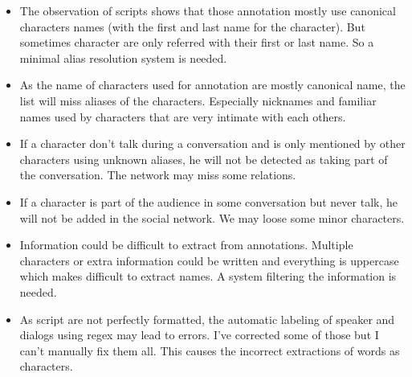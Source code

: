\documentclass[a4paper, 12pt]{report}
\begin{document}
\begin{itemize}
\item 
 The observation of scripts shows that those annotation mostly use canonical characters names (with the first and last name for the character). 
 But sometimes character are only referred with their first or last name. So a minimal alias resolution system is needed. 
\item
As the name of characters used for annotation are mostly canonical name, the list will miss aliases of the characters. 
Especially nicknames and familiar names used by characters that are very intimate with each others.
\item If a character don't talk during a conversation and is only mentioned by other characters using unknown aliases, 
he will not be detected as taking part of the conversation. The network may miss some relations.
\item 
If a character is part of the audience in some conversation but never talk, he will not be added in the social network. We may loose some minor characters.
\item Information could be difficult to extract from annotations. 
Multiple characters or extra information could be written and everything is uppercase which makes difficult to extract names. A system filtering the information is needed.
\item As script are not perfectly formatted, the automatic labeling of speaker and dialogs using regex may lead to errors. 
I've corrected some of those but I can't manually fix them all. This causes the incorrect extractions of words as characters. 
\end{itemize}
\end{document}
